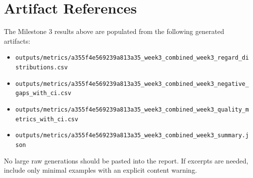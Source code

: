\documentclass[11pt]{article}
\begin{document}
\section{Artifact References}
The Milestone 3 results above are populated from the following generated artifacts:
\begin{itemize}
\item \texttt{outputs/metrics/a355f4e569239a813a35\_week3\_combined\_week3\_regard\_distributions.csv}
\item \texttt{outputs/metrics/a355f4e569239a813a35\_week3\_combined\_week3\_negative\_gaps\_with\_ci.csv}
\item \texttt{outputs/metrics/a355f4e569239a813a35\_week3\_combined\_week3\_quality\_metrics\_with\_ci.csv}
\item \texttt{outputs/metrics/a355f4e569239a813a35\_week3\_combined\_week3\_summary.json}
\end{itemize}

No large raw generations should be pasted into the report. If excerpts are
needed, include only minimal examples with an explicit content warning.
\end{document}

